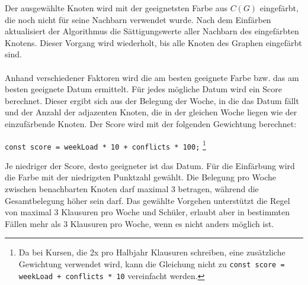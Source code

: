 Der ausgewählte Knoten wird mit der geeignetsten Farbe aus $C(G)$ eingefärbt, die noch nicht für seine Nachbarn verwendet wurde. Nach dem Einfärben aktualisiert der Algorithmus die Sättigungswerte aller Nachbarn des eingefärbten Knotens. Dieser Vorgang wird wiederholt, bis alle Knoten des Graphen eingefärbt sind.\\\\
Anhand verschiedener Faktoren wird die am besten geeignete Farbe bzw. das am besten geeignete Datum ermittelt. Für jedes mögliche Datum wird ein Score berechnet. Dieser ergibt sich aus der Belegung der Woche, in die das Datum fällt und der Anzahl der adjazenten Knoten, die in der gleichen Woche liegen wie der einzufärbende Knoten. Der Score wird mit der folgenden Gewichtung berechnet: 
\begin{center}
\texttt{const score = weekLoad * 10 + conflicts * 100;}
\footnote[1]{Da bei Kursen, die 2x pro Halbjahr Klausuren schreiben, eine zusätzliche Gewichtung verwendet wird, kann die Gleichung nicht zu \texttt{const score = weekLoad + conflicts * 10} vereinfacht werden.}
\end{center}
Je niedriger der Score, desto geeigneter ist das Datum. Für die Einfärbung wird die Farbe mit der niedrigsten Punktzahl gewählt. Die Belegung pro Woche zwischen benachbarten Knoten darf maximal 3 betragen, während die Gesamtbelegung höher sein darf. Das gewählte Vorgehen unterstützt die Regel von maximal 3 Klausuren pro Woche und Schüler, erlaubt aber in bestimmten Fällen mehr als 3 Klausuren pro Woche, wenn es nicht anders möglich ist.
